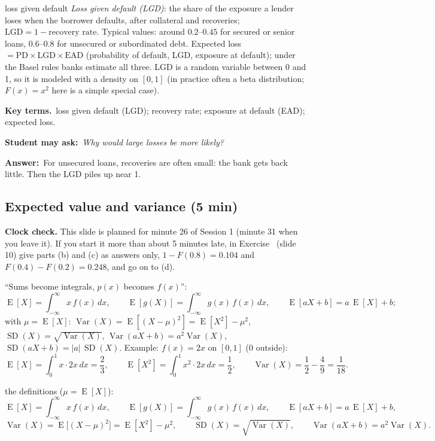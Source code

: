 \documentclass[11pt,a4paper,parskip=half]{scrartcl}
\renewcommand{\needspace}[1]{\Needspace{6\baselineskip}}
\newcommand{\E}{\operatorname{E}}
\newcommand{\Var}{\operatorname{Var}}
\newcommand{\SD}{\operatorname{SD}}
\newcommand{\terms}{\par\textbf{\color{plum}Key terms.}\ }
\newcommand{\sq}[1]{\par\textbf{\color{plum}Student may ask:}\ \emph{#1}\par}
\newcommand{\ans}{\textbf{Answer:}\ }
\begin{document}
\begin{bg}{loss given default}
	\emph{Loss given default (LGD)}: the share of the exposure a lender
	loses when the borrower defaults, after collateral and recoveries;
	$\text{LGD}=1-\text{recovery rate}$. Typical values: around
	$0.2$--$0.45$ for secured or senior loans, $0.6$--$0.8$ for unsecured or
	subordinated debt. Expected loss $=\text{PD}\times\text{LGD}\times
		\text{EAD}$ (probability of default, LGD, exposure at default); under
	the Basel rules banks estimate all three. LGD is a random variable
	between 0 and 1, so it is modeled with a density on $[0,1]$ (in practice
	often a beta distribution; $F(x)=x^2$ here is a simple special case).

	\terms loss given default (LGD); recovery rate; exposure at default
	(EAD); expected loss.

	\sq{Why would large losses be more likely?}
	\ans For unsecured loans, recoveries are often small: the bank gets
	back little. Then the LGD piles up near 1.
\end{bg}

\needspace{0.35\textheight}
\subsection{Expected value and variance (5 min)}

\begin{clockcheck}
	\textbf{Clock check.} This slide is planned for minute 26 of Session 1
	(minute 31 when you leave it). If you start it more than about 5 minutes
	late, in Exercise~ (slide 10) give parts (b) and
	(c) as answers only, $1-F(0.8)=0.104$ and $F(0.4)-F(0.2)=0.248$, and go
	on to (d).
\end{clockcheck}

\begin{onslide}
	``Sums become integrals, $p(x)$ becomes $f(x)$'':
	\[ \E[X]=\int_{-\infty}^{\infty}x\,f(x)\,dx,\qquad
		\E[g(X)]=\int_{-\infty}^{\infty}g(x)\,f(x)\,dx,\qquad
		\E[aX+b]=a\,\E[X]+b; \]
	with $\mu=\E[X]$: $\Var(X)=\E[(X-\mu)^2]=\E[X^2]-\mu^2$,
	$\SD(X)=\sqrt{\Var(X)}$, $\Var(aX+b)=a^2\Var(X)$,
	$\SD(aX+b)=|a|\,\SD(X)$. Example: $f(x)=2x$ on $[0,1]$ (0 outside):
	\[ \E[X]=\int_0^1x\cdot2x\,dx=\frac23,\qquad
		\E[X^2]=\int_0^1x^2\cdot2x\,dx=\frac12,\qquad
		\Var(X)=\frac12-\frac49=\frac1{18}. \]
\end{onslide}

\begin{printeq}
\begin{slidefig}
	the definitions ($\mu=\E[X]$):
	\[ \E[X]=\int_{-\infty}^{\infty}x\,f(x)\,dx,\qquad
		\E[g(X)]=\int_{-\infty}^{\infty}g(x)\,f(x)\,dx,\qquad
		\E[aX+b]=a\,\E[X]+b, \]
	\[ \Var(X)=\E\big[(X-\mu)^2\big]=\E[X^2]-\mu^2,\qquad
		\SD(X)=\sqrt{\Var(X)},\qquad \Var(aX+b)=a^2\Var(X). \]
\end{slidefig}
\end{printeq}
\end{document}
